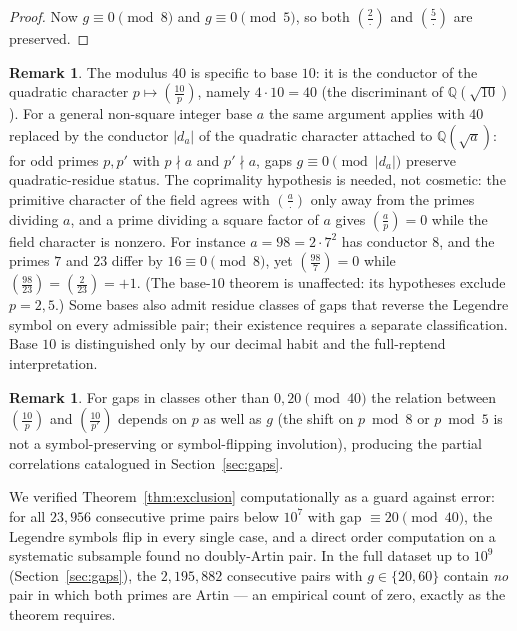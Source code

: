 \documentclass[11pt,reqno]{amsart}
\theoremstyle{plain}
\theoremstyle{definition}
\newtheorem{remark}[theorem]{Remark}
\newcommand{\Lsym}[2]{\left(\tfrac{#1}{#2}\right)}
\begin{document}
\begin{proof}
	Now $g \equiv 0 \pmod 8$ and $g \equiv 0 \pmod 5$, so both
	$\Lsym{2}{\cdot}$ and $\Lsym{5}{\cdot}$ are preserved.
\end{proof}

\begin{remark}
	The modulus $40$ is specific to base $10$: it is the conductor of the
	quadratic character $p \mapsto \Lsym{10}{p}$, namely $4 \cdot 10 = 40$ (the
	discriminant of $\mathbb{Q}(\sqrt{10})$). For a general non-square integer base $a$
	the same argument applies with $40$ replaced by the conductor $|d_a|$ of the
	quadratic character attached to $\mathbb{Q}(\sqrt{a})$: for odd primes
	$p, p'$ with $p \nmid a$ and $p' \nmid a$, gaps
	$g \equiv 0 \pmod{|d_a|}$ preserve quadratic-residue status. The
	coprimality hypothesis is needed, not cosmetic: the primitive character of
	the field agrees with $\Lsym{a}{\cdot}$ only away from the primes dividing
	$a$, and a prime dividing a square factor of $a$ gives $\Lsym{a}{p} = 0$
	while the field character is nonzero. For instance $a = 98 = 2 \cdot 7^2$
	has conductor $8$, and the primes $7$ and $23$ differ by $16 \equiv 0
	\pmod 8$, yet $\Lsym{98}{7} = 0$ while $\Lsym{98}{23} = \Lsym{2}{23} = +1$.
	(The base-$10$ theorem is unaffected: its hypotheses exclude $p = 2, 5$.) Some bases also
	admit residue classes of gaps that reverse the Legendre symbol on every
	admissible pair; their existence requires a separate classification.
	Base $10$ is distinguished only by our decimal habit and the
	full-reptend interpretation.
\end{remark}

\begin{remark}
	For gaps in classes other than $0, 20 \pmod{40}$ the relation between
	$\Lsym{10}{p}$ and $\Lsym{10}{p'}$ depends on $p$ as well as $g$ (the shift on
	$p \bmod 8$ or $p \bmod 5$ is not a symbol-preserving or symbol-flipping
	involution), producing the partial correlations catalogued in
	Section~\ref{sec:gaps}.
\end{remark}

We verified Theorem~\ref{thm:exclusion} computationally as a guard against
error: for all $23{,}956$ consecutive prime pairs below $10^7$ with gap
$\equiv 20 \pmod{40}$, the Legendre symbols flip in every single case, and a
direct order computation on a systematic subsample found no doubly-Artin pair.
In the full dataset up to $10^9$ (Section~\ref{sec:gaps}), the
$2{,}195{,}882$ consecutive pairs with $g \in \{20, 60\}$ contain \emph{no}
pair in which both primes are Artin --- an empirical count of zero, exactly as
the theorem requires.
\end{document}
